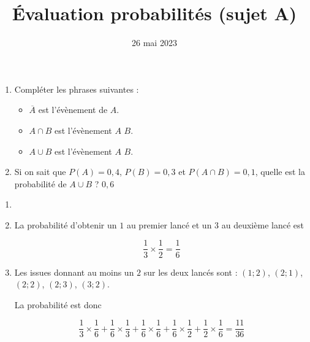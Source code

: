 \documentclass[
	classe=$2^{de}$
]{évaluation}
\date{26 mai 2023}
\begin{document}
\title{Évaluation probabilités (sujet A)}
\maketitle

\begin{exercice}
	\begin{enumerate}
		\item Compléter les phrases suivantes :
		      \begin{itemize}
			      \item $\overline{A}$ est l'évènement  de $A$.
			      \item $A ∩ B$ est l'évènement $A$  $B$.
			      \item $A ∪ B$ est l'évènement $A$  $B$.
		      \end{itemize}
		\item Si on sait que $P(A) = 0,4$, $P(B) = 0,3$ et $P(A ∩ B) = 0,1$, quelle est la probabilité de $A ∪ B$ ? {\color{red}$0,6$}
	\end{enumerate}
\end{exercice}

\begin{exercice}
	\begin{multicols}{2}
		\begin{enumerate}
			\item \
			      \begin{center}
			      \end{center}
			\item La probabilité d'obtenir un $1$ au premier lancé et un $3$ au deuxième lancé est

			      $$ \dfrac{1}{3} × \dfrac{1}{2} = \dfrac{1}{6} $$
			\item Les issues donnant au moins un $2$ sur les deux lancés sont : $(1 ; 2)$, $(2 ; 1)$, $(2 ; 2)$, $(2 ; 3)$, $(3 ; 2)$.

			      La probabilité est donc

			      $$ \dfrac{1}{3} × \dfrac{1}{6} + \dfrac{1}{6} × \dfrac{1}{3} + \dfrac{1}{6} × \dfrac{1}{6} + \dfrac{1}{6} × \dfrac{1}{2} + \dfrac{1}{2} × \dfrac{1}{6} = \dfrac{11}{36} $$
		\end{enumerate}
	\end{multicols}
\end{exercice}
\end{document}
